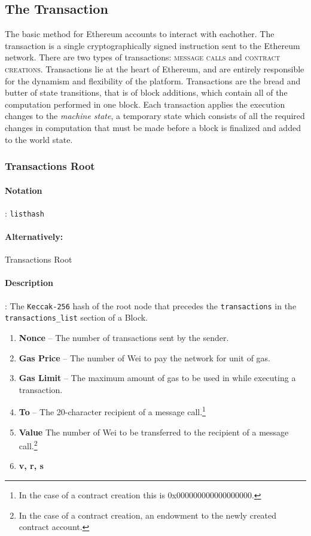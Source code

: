 \documentclass[10pt,a4paper,leqno,bibliography=totoc]{scrartcl}
\newenvironment{alphafootnotes}
{\par\edef\savedfootnotenumber{\number\value{footnote}}
\renewcommand{\thefootnote}{\alph{footnote}}
\setcounter{footnote}{0}}
{\par\setcounter{footnote}{\savedfootnotenumber}}
\begin{document}
\begin{alphafootnotes}
\begin{multicols*}{2}
					\subsection{The Transaction}
	
			The basic method for Ethereum accounts to interact with eachother. The transaction is a single cryptographically signed instruction sent to the Ethereum network. There are two types of transactions: \textsc{message calls} and \textsc{contract creations}. Transactions lie at the heart of Ethereum, and are entirely responsible for the dynamism and flexibility of the platform. Transactions are the bread and butter of state transitions, that is of block additions, which contain all of the computation performed in one block. Each transaction applies the execution changes to the \textit{machine state}, a temporary state which consists of all the required changes in computation that must be made before a block is finalized and added to the world state.
		\subsubsection{Transactions Root}

			\paragraph{Notation}: \texttt{listhash}
			\paragraph{Alternatively:} Transactions Root
			\paragraph{Description}: The \texttt{Keccak-256} hash of the root node that precedes the \texttt{transactions} in the \texttt{transactions\_list} section of a Block.			
			
			\begin{enumerate}
				
				\item \textbf{Nonce} -- The number of transactions sent by the sender.
				\item \textbf{Gas Price} -- The number of Wei to pay the network for unit of gas.
				\item \textbf{Gas Limit} -- The maximum amount of gas to be used in while executing a transaction.			
				\item \textbf{To} -- The 20-character recipient of a message call.\footnote{In the case of a contract creation this is 0x000000000000000000.}
				\item \textbf{Value} The number of Wei to be transferred to the recipient of a message call.\footnote{In the case of a contract creation, an endowment to the newly created contract account.}
				\item \textbf{v, r, s} 
			\end{enumerate}
			

\end{multicols*}
\end{alphafootnotes}
\end{document}
